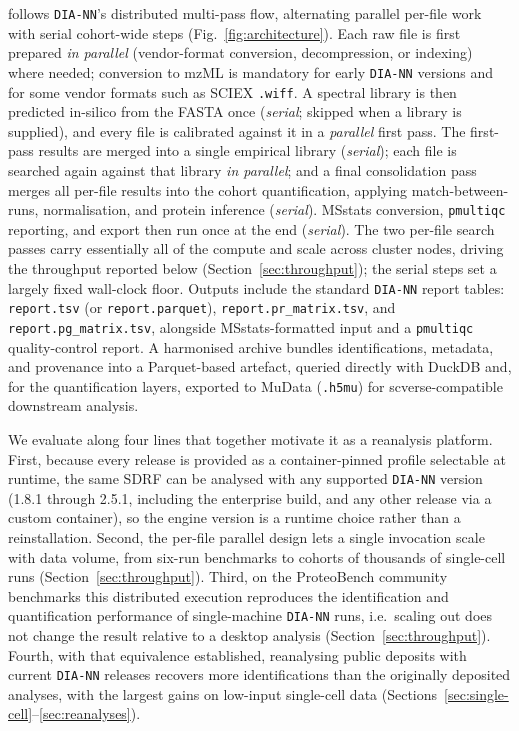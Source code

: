 \documentclass[preprint,12pt]{elsarticle}
\begin{document}
\quantmsdiann{} follows \texttt{DIA-NN}'s distributed multi-pass flow, alternating parallel per-file work with serial cohort-wide steps (Fig.~\ref{fig:architecture}). Each raw file is first prepared \emph{in parallel} (vendor-format conversion, decompression, or indexing) where needed; conversion to mzML is mandatory for early \texttt{DIA-NN} versions and for some vendor formats such as SCIEX \texttt{.wiff}. A spectral library is then predicted in-silico from the FASTA once (\emph{serial}; skipped when a library is supplied), and every file is calibrated against it in a \emph{parallel} first pass. The first-pass results are merged into a single empirical library (\emph{serial}); each file is searched again against that library \emph{in parallel}; and a final consolidation pass merges all per-file results into the cohort quantification, applying match-between-runs, normalisation, and protein inference (\emph{serial}). MSstats conversion, \texttt{pmultiqc} reporting, and \qpx{} export then run once at the end (\emph{serial}). The two per-file search passes carry essentially all of the compute and scale across cluster nodes, driving the throughput reported below (Section~\ref{sec:throughput}); the serial steps set a largely fixed wall-clock floor.
Outputs include the standard \texttt{DIA-NN} report tables: \texttt{report.tsv} (or \texttt{report.parquet}), \texttt{report.pr\_matrix.tsv}, and \texttt{report.pg\_matrix.tsv}, alongside MSstats-formatted input and a \texttt{pmultiqc}~\cite{yue2026pmultiqc} quality-control report. A harmonised \qpx{} archive bundles identifications, metadata, and provenance into a Parquet-based artefact, queried directly with DuckDB and, for the quantification layers, exported to MuData (\texttt{.h5mu}) for scverse-compatible~\cite{virshup2023scverse} downstream analysis.

We evaluate \quantmsdiann{} along four lines that together motivate it as a reanalysis platform. First, because every release is provided as a container-pinned profile selectable at runtime, the same SDRF can be analysed with any supported \texttt{DIA-NN} version (1.8.1 through 2.5.1, including the enterprise build, and any other release via a custom container), so the engine version is a runtime choice rather than a reinstallation. Second, the per-file parallel design lets a single invocation scale with data volume, from six-run benchmarks to cohorts of thousands of single-cell runs (Section~\ref{sec:throughput}). Third, on the ProteoBench community benchmarks this distributed execution reproduces the identification and quantification performance of single-machine \texttt{DIA-NN} runs, i.e.\ scaling out does not change the result relative to a desktop analysis (Section~\ref{sec:throughput}). Fourth, with that equivalence established, reanalysing public deposits with current \texttt{DIA-NN} releases recovers more identifications than the originally deposited analyses, with the largest gains on low-input single-cell data (Sections~\ref{sec:single-cell}--\ref{sec:reanalyses}).
\end{document}
